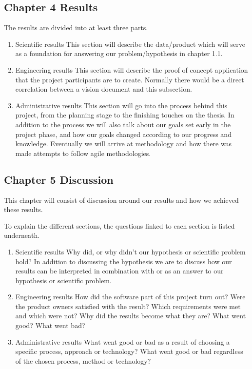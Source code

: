 
\subsection{Chapter 4 Results}
The results are divided into at least three parts.
\begin{enumerate}
    \item Scientific results
    This section will describe the data/product which will serve as a foundation for answering our problem/hypothesis in chapter 1.1.
    
    \item Engineering results
    This section will describe the proof of concept application that the project participants are to create. Normally there would be a direct correlation between a vision document and this subsection.
    
    \item Administrative results
    This section will go into the process behind this project, from the planning stage to the finishing touches on the thesis. In addition to the process we will also talk about our goals set early in the project phase, and how our goals changed according to our progress and knowledge. Eventually we will arrive at methodology and how there was made attempts to follow agile methodologies.
    
\end{enumerate}

\subsection{Chapter 5 Discussion}
This chapter will consist of discussion around our results and how we achieved these results. 

To explain the different sections, the questions linked to each section is listed underneath.
\begin{enumerate}
    \item Scientific results
    Why did, or why didn't our hypothesis or scientific problem hold?
    In addition to discussing the hypothesis we are to discuss how our results can be interpreted in combination with or as an answer to our hypothesis or scientific problem.
    
    \item Engineering results
    How did the software part of this project turn out? Were the product owners satisfied with the result? Which requirements were met and which were not? Why did the results become what they are? What went good? What went bad?
    
    \item Administrative results
    What went good or bad as a result of choosing a specific process, approach or technology? What went good or bad regardless of the chosen process, method or technology?
    
\end{enumerate}

